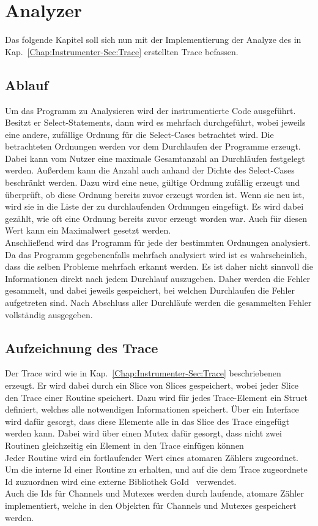 
\chapter{Analyzer} \label{Chap:Implement}

Das folgende Kapitel soll sich nun mit der Implementierung der Analyze des in 
Kap.~\ref{Chap:Instrumenter-Sec:Trace} erstellten 
Trace befassen.

\section{Ablauf}
Um das Programm zu Analysieren wird der instrumentierte Code ausgeführt.
Besitzt er Select-Statements, dann wird es mehrfach durchgeführt, 
wobei jeweils eine andere, zufällige Ordnung für die Select-Cases 
betrachtet wird. Die betrachteten Ordnungen werden vor dem Durchlaufen 
der Programme erzeugt. Dabei kann vom Nutzer eine maximale 
Gesamtanzahl an Durchläufen festgelegt werden. Außerdem kann die 
Anzahl auch anhand der Dichte des Select-Cases beschränkt werden. Dazu wird 
eine neue, gültige Ordnung zufällig erzeugt und überprüft, ob diese 
Ordnung bereits zuvor erzeugt worden ist. Wenn sie neu ist, wird sie in 
die Liste der zu durchlaufenden Ordnungen eingefügt. Es wird dabei gezählt,
wie oft eine Ordnung bereits zuvor erzeugt worden war. Auch für diesen 
Wert kann ein Maximalwert gesetzt werden.\\
Anschließend wird das Programm für jede der bestimmten Ordnungen analysiert.
Da das Programm gegebenenfalls mehrfach analysiert wird ist es wahrscheinlich, dass 
die selben Probleme mehrfach erkannt werden. Es ist daher nicht sinnvoll 
die Informationen direkt nach jedem Durchlauf auszugeben. Daher werden die 
Fehler gesammelt, und dabei jeweils gespeichert, bei welchen Durchlaufen die 
Fehler aufgetreten sind. Nach Abschluss aller Durchläufe werden die 
gesammelten Fehler vollständig ausgegeben.

\section{Aufzeichnung des Trace}
Der Trace wird wie in Kap.~\ref{Chap:Instrumenter-Sec:Trace}
beschriebenen erzeugt. Er wird dabei durch ein Slice von Slices 
gespeichert, wobei jeder Slice den Trace einer Routine 
speichert. Dazu wird für jedes Trace-Element ein Struct definiert, 
welches alle notwendigen Informationen speichert. Über ein Interface 
wird dafür gesorgt, dass diese Elemente alle in das Slice des Trace eingefügt
werden kann. Dabei wird über einen Mutex dafür gesorgt, dass nicht 
zwei Routinen gleichzeitig ein Element in den Trace einfügen können\\
Jeder Routine wird ein fortlaufender Wert eines atomaren Zählers zugeordnet. 
Um die interne Id einer Routine zu erhalten, und auf die dem Trace zugeordnete 
Id zuzuordnen wird eine externe Bibliothek GoId~\cite{goid} verwendet.\\
Auch die Ids für Channels und Mutexes werden durch laufende, atomare Zähler 
implementiert, welche in den Objekten für Channels und Mutexes gespeichert werden.

